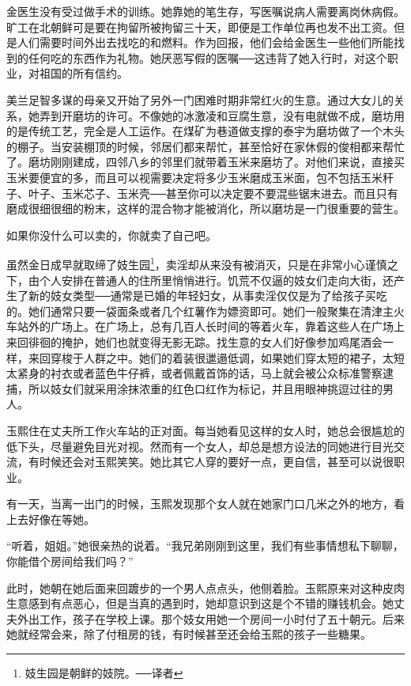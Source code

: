 金医生没有受过做手术的训练。她靠她的笔生存，写医嘱说病人需要离岗休病假。旷工在北朝鲜可是要在拘留所被拘留三十天，即便是工作单位再也发不出工资。但是人们需要时间外出去找吃的和燃料。作为回报，他们会给金医生一些他们所能找到的任何吃的东西作为礼物。她厌恶写假的医嘱──这违背了她入行时，对这个职业，对祖国的所有信约。

美兰足智多谋的母亲又开始了另外一门困难时期非常红火的生意。通过大女儿的关系，她弄到开磨坊的许可。不像她的冰激凌和豆腐生意，没有电就做不成，磨坊用的是传统工艺，完全是人工运作。在煤矿为巷道做支撑的泰宇为磨坊做了一个木头的棚子。当安装棚顶的时候，邻居们都来帮忙，甚至恰好在家休假的俊相都来帮忙了。磨坊刚刚建成，四邻八乡的邻里们就带着玉米来磨坊了。对他们来说，直接买玉米要便宜的多，而且可以视需要决定将多少玉米磨成玉米面，包不包括玉米秆子、叶子、玉米芯子、玉米壳──甚至你可以决定要不要混些锯末进去。而且只有磨成很细很细的粉末，这样的混合物才能被消化，所以磨坊是一门很重要的营生。

如果你没什么可以卖的，你就卖了自己吧。

虽然金日成早就取缔了妓生园\footnote{妓生园是朝鲜的妓院。──译者}，卖淫却从来没有被消灭，只是在非常小心谨慎之下，由个人安排在普通人的住所里悄悄进行。饥荒不仅逼的妓女们走向大街，还产生了新的妓女类型──通常是已婚的年轻妇女，从事卖淫仅仅是为了给孩子买吃的。她们通常只要一袋面条或者几个红薯作为嫖资即可。她们一般聚集在清津主火车站外的广场上。在广场上，总有几百人长时间的等着火车，靠着这些人在广场上来回徘徊的掩护，她们也就变得无影无踪。找生意的女人们好像参加鸡尾酒会一样，来回穿梭于人群之中。她们的着装很邋遢低调，如果她们穿太短的裙子，太短太紧身的衬衣或者蓝色牛仔裤，或者佩戴首饰的话，马上就会被公众标准警察逮捕，所以妓女们就采用涂抹浓重的红色口红作为标记，并且用眼神挑逗过往的男人。

玉熙住在丈夫所工作火车站的正对面。每当她看见这样的女人时，她总会很尴尬的低下头，尽量避免目光对视。然而有一个女人，却总是想方设法的同她进行目光交流，有时候还会对玉熙笑笑。她比其它人穿的要好一点，更自信，甚至可以说很职业。

有一天，当离一出门的时候，玉熙发现那个女人就在她家门口几米之外的地方，看上去好像在等她。

“听着，姐姐。”她很亲热的说着。“我兄弟刚刚到这里，我们有些事情想私下聊聊，你能借个房间给我们吗？”

此时，她朝在她后面来回踱步的一个男人点点头，他侧着脸。玉熙原来对这种皮肉生意感到有点恶心，但是当真的遇到时，她却意识到这是个不错的赚钱机会。她丈夫外出工作，孩子在学校上课。那个妓女用她一个房间一小时付了五十朝元。后来她就经常会来，除了付租房的钱，有时候甚至还会给玉熙的孩子一些糖果。

